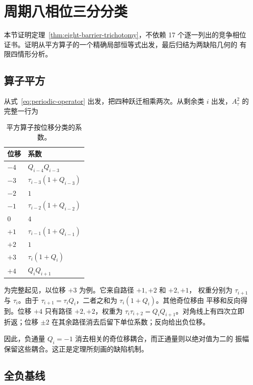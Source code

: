 \section{周期八相位三分分类}\label{sec:eight-barrier}

本节证明定理~\ref{thm:eight-barrier-trichotomy}，不依赖 17 个逐一列出的竞争相位
证书。证明从平方算子的一个精确局部恒等式出发，最后归结为两缺陷几何的
有限四情形分析。

\subsection{算子平方}

从式~\eqref{eq:periodic-operator} 出发，把四种跃迁相乘两次。从剩余类 \(i\)
出发，\(A_\tau^2\) 的完整一行为

\begin{table}[tbp]
\centering
\caption{平方算子按位移分类的系数。}
\label{tab:squared-operator-coefficients}
\begingroup
\renewcommand{\arraystretch}{1.12}
\begin{tabular}{ll}
\toprule
位移 & 系数 \\
\midrule
\(-4\) & \(Q_{i-4}Q_{i-3}\) \\
\(-3\) & \(\tau_{i-3}(1+Q_{i-3})\) \\
\(-2\) & \(1\) \\
\(-1\) & \(\tau_{i-2}(1+Q_{i-2})\) \\
\(0\) & \(4\) \\
\(+1\) & \(\tau_{i-1}(1+Q_{i-1})\) \\
\(+2\) & \(1\) \\
\(+3\) & \(\tau_i(1+Q_i)\) \\
\(+4\) & \(Q_iQ_{i+1}\) \\
\bottomrule
\end{tabular}
\endgroup
\end{table}

为完整起见，以位移 \(+3\) 为例。它来自路径 \(+1,+2\) 和 \(+2,+1\)，
权重分别为 \(\tau_{i+1}\) 与 \(\tau_i\)。由于
\(\tau_{i+1}=\tau_iQ_i\)，二者之和为 \(\tau_i(1+Q_i)\)。其他奇位移由
平移和反向得到。位移 \(+4\) 只有路径 \(+2,+2\)，权重为
\(\tau_i\tau_{i+2}=Q_iQ_{i+1}\)。对角线上有四次立即折返；位移
\(\pm2\) 在其余路径消去后留下单位系数；反向给出负位移。

因此，负通量 \(Q_i=-1\) 消去相关的奇位移耦合，而正通量则以绝对值为二的
振幅保留这些耦合。这正是定理所刻画的缺陷机制。

\subsection{全负基线}\label{subsec:all-negative-baseline}

